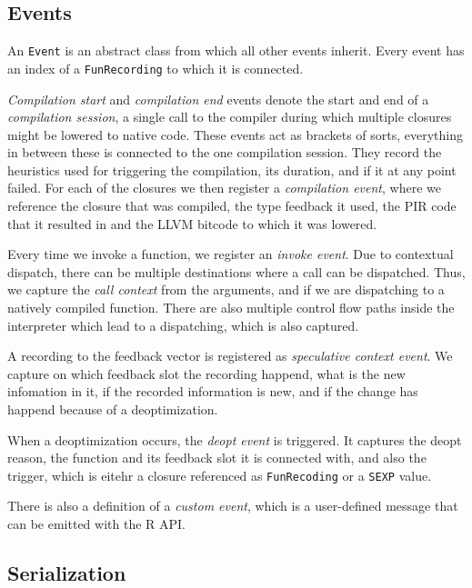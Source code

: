 \subsection{Events}

An \texttt{Event} is an abstract class from which all other events inherit. Every event has an index of a \texttt{FunRecording} to which it is connected.

\textit{Compilation start} and \textit{compilation end} events denote the start and end of a \textit{compilation session}, a single call to the compiler during which multiple closures might be lowered to native code. These events act as brackets of sorts, everything in between these is connected to the one compilation session. They record the heuristics used for triggering the compilation, its duration, and if it at any point failed. For each of the closures we then register a \textit{compilation event}, where we reference the closure that was compiled, the type feedback it used, the PIR code that it resulted in and the LLVM bitcode to which it was lowered.

Every time we invoke a function, we register an \textit{invoke event}. Due to contextual dispatch, there can be multiple destinations where a call can be dispatched. Thus, we capture the \textit{call context} from the arguments, and if we are dispatching to a natively compiled function. There are also multiple control flow paths inside the interpreter which lead to a dispatching, which is also captured.

A recording to the feedback vector is registered as \textit{speculative context event}. We capture on which feedback slot the recording happend, what is the new infomation in it, if the recorded information is new, and if the change has happend because of a deoptimization.

When a deoptimization occurs, the \textit{deopt event} is triggered. It captures the deopt reason, the function and its feedback slot it is connected with, and also the trigger, which is eitehr a closure referenced as \texttt{FunRecoding} or a \texttt{SEXP} value.

There is also a definition of a \textit{custom event}, which is a user-defined message that can be emitted with the R API.

\subsection{Serialization}

